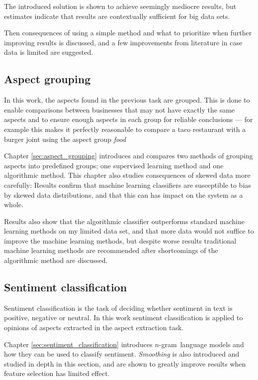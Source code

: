 \documentclass[a4paper,11pt]{kth-mag}
\newcommand{\ngram}{$n$-gram}
\begin{document}
The introduced solution is shown to achieve seemingly mediocre results, but estimates indicate
that results are contextually sufficient for big data sets.

Then consequences of using a simple method and what to prioritize when further improving results is discussed,
and a few improvements from literature in case data is limited are suggested.

\subsection{Aspect grouping}
In this work, the aspects found in the previous task are grouped. This is done to enable comparisons between
businesses that may not have exactly the same aspects and to ensure enough aspects in each group for reliable conclusions --- for example this makes it perfectly reasonable to compare a taco restaurant with a burger joint using the aspect group \emph{food}

Chapter \ref{sec:aspect_grouping} introduces and compares two methods of grouping aspects into predefined groups;
one supervised learning method and one algorithmic method.
This chapter also studies consequences of skewed data more carefully: Results confirm that machine learning classifiers are susceptible to bias by skewed data distributions, and that this can has impact on the system as a whole.

Results also show that the algorithmic classifier outperforms standard machine learning methods on my
limited data set, and that more data would not suffice to improve the machine learning methods,
but despite worse results traditional machine learning methods are recommended after shortcomings of the
algorithmic method are discussed.


\subsection{Sentiment classification}
Sentiment classification is the task of deciding whether sentiment in text is positive, negative or neutral.
In this work sentiment classification is applied to opinions of aspects extracted in the aspect extraction task.

Chapter \ref{sec:sentiment_classification} introduces \ngram~language models and how they can be used
to classify sentiment. \emph{Smoothing} is also introduced and studied in depth in this section, and are shown
to greatly improve results when feature selection has limited effect.
\end{document}
